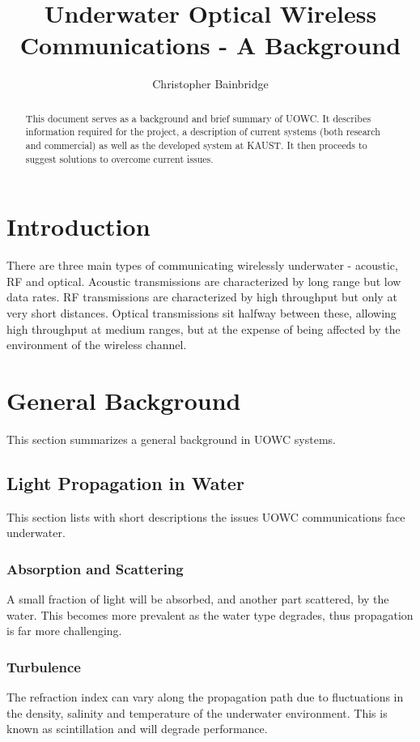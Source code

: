 \documentclass{article}
\author{Christopher Bainbridge}
\title{Underwater Optical Wireless Communications - A Background}
\begin{document}
\maketitle

\begin{abstract}
This document serves as a background and brief summary of \ac{UOWC}. It
describes information required for the project, a description of current
systems (both research and commercial) as well as the developed system at
\ac{KAUST}. It then proceeds to suggest solutions to overcome current
issues.
\end{abstract}

\section{Introduction}
There are three main types of communicating wirelessly underwater -
acoustic, RF and optical. Acoustic transmissions are characterized by
long range but low data rates. RF transmissions are characterized by
high throughput but only at very short distances. Optical transmissions
sit halfway between these, allowing high throughput at medium ranges,
but at the expense of being affected by the environment of the wireless
channel.

\section{General Background}
This section summarizes a general background in \ac{UOWC} systems.

\subsection{Light Propagation in Water}
This section lists with short descriptions the issues \ac{UOWC}
communications face underwater.

\subsubsection{Absorption and Scattering}
A small fraction of light will be absorbed, and another part scattered,
by the water. This becomes more prevalent as the water type degrades,
thus propagation is far more challenging.

\subsubsection{Turbulence}
The refraction index can vary along the propagation path due to
fluctuations in the density, salinity and temperature of the underwater
environment. This is known as scintillation and will degrade performance.
\end{document}
